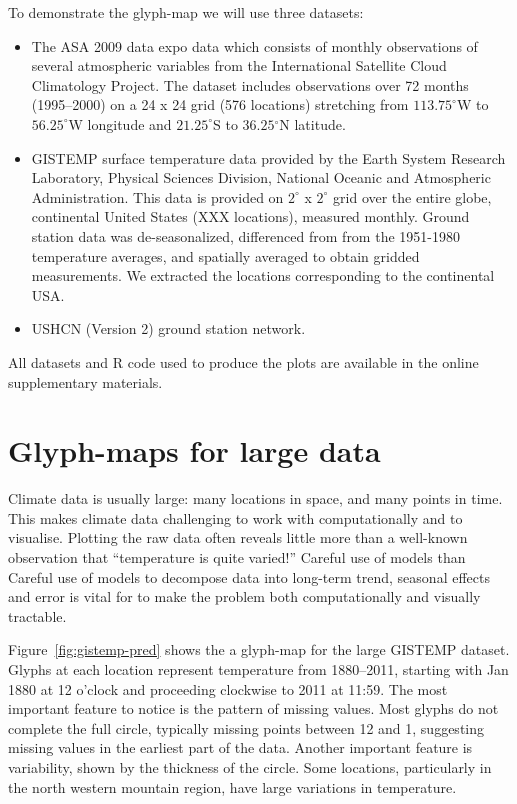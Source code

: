 \documentclass[oneside]{article}
\begin{document}
To demonstrate the glyph-map we will use three datasets:

\begin{itemize}

  \item The ASA 2009 data expo data which consists of monthly observations of
  several atmospheric variables from the International Satellite Cloud
  Climatology Project. The dataset includes observations over 72 months
  (1995--2000) on a 24 x 24 grid (576 locations) stretching from
  $113.75^{\circ}$W to $56.25^{\circ}$W longitude and $21.25^{\circ}$S to
  $36.25{^\circ}$N latitude.

  \item GISTEMP surface temperature data provided by the Earth System Research
  Laboratory, Physical Sciences Division, National Oceanic and Atmospheric
  Administration. This data is provided on $2^{\circ}$ x $2^{\circ}$ grid over
  the entire globe, continental United States (XXX locations), measured
  monthly. Ground station data was de-seasonalized, differenced from from the
  1951-1980 temperature averages, and spatially averaged to obtain gridded
  measurements. We extracted the locations corresponding to the continental
  USA.

  \item USHCN (Version 2) ground station network.
  
\end{itemize}

All datasets and R code used to produce the plots are available in the online supplementary materials.

\section{Glyph-maps for large data}
\label{sec:large-data}

Climate data is usually large: many locations in space, and many points in time. This makes climate data challenging to work with computationally and to visualise. Plotting the raw data often reveals little more than a well-known observation that ``temperature is quite varied!'' Careful use of models than Careful use of models to decompose data into long-term trend, seasonal effects and error is vital for to make the problem both computationally and visually tractable.

Figure~\ref{fig:gistemp-pred} shows the a glyph-map for the large GISTEMP dataset. Glyphs at each location represent temperature from 1880--2011, starting with Jan 1880 at 12 o'clock and proceeding clockwise to 2011 at 11:59. The most important feature to notice is the pattern of missing values. Most glyphs do not complete the full circle, typically missing points between 12 and 1, suggesting missing values in the earliest part of the data. Another important feature is variability, shown by the thickness of the circle. Some locations, particularly in the north western mountain region, have large variations in temperature. 
\end{document}
